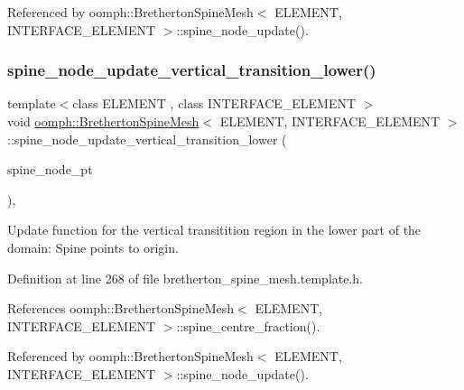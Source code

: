 Referenced by oomph\+::\+Bretherton\+Spine\+Mesh$<$ E\+L\+E\+M\+E\+N\+T, I\+N\+T\+E\+R\+F\+A\+C\+E\+\_\+\+E\+L\+E\+M\+E\+N\+T $>$\+::spine\+\_\+node\+\_\+update().

\mbox{\label{classoomph_1_1BrethertonSpineMesh_a9ec578183760e386ed5229ba193e1fdf}} 
\subsubsection{\texorpdfstring{spine\+\_\+node\+\_\+update\+\_\+vertical\+\_\+transition\+\_\+lower()}{spine\_node\_update\_vertical\_transition\_lower()}}
{\footnotesize\ttfamily template$<$class E\+L\+E\+M\+E\+NT , class I\+N\+T\+E\+R\+F\+A\+C\+E\+\_\+\+E\+L\+E\+M\+E\+NT $>$ \\
void \hyperlink{classoomph_1_1BrethertonSpineMesh}{oomph\+::\+Bretherton\+Spine\+Mesh}$<$ E\+L\+E\+M\+E\+NT, I\+N\+T\+E\+R\+F\+A\+C\+E\+\_\+\+E\+L\+E\+M\+E\+NT $>$\+::spine\+\_\+node\+\_\+update\+\_\+vertical\+\_\+transition\+\_\+lower (\begin{DoxyParamCaption}\item[{Spine\+Node $\ast$}]{spine\+\_\+node\+\_\+pt }\end{DoxyParamCaption})\hspace{0.3cm}{\ttfamily [inline]}, {\ttfamily [protected]}}



Update function for the vertical transitition region in the lower part of the domain\+: Spine points to origin. 



Definition at line 268 of file bretherton\+\_\+spine\+\_\+mesh.\+template.\+h.



References oomph\+::\+Bretherton\+Spine\+Mesh$<$ E\+L\+E\+M\+E\+N\+T, I\+N\+T\+E\+R\+F\+A\+C\+E\+\_\+\+E\+L\+E\+M\+E\+N\+T $>$\+::spine\+\_\+centre\+\_\+fraction().



Referenced by oomph\+::\+Bretherton\+Spine\+Mesh$<$ E\+L\+E\+M\+E\+N\+T, I\+N\+T\+E\+R\+F\+A\+C\+E\+\_\+\+E\+L\+E\+M\+E\+N\+T $>$\+::spine\+\_\+node\+\_\+update().

